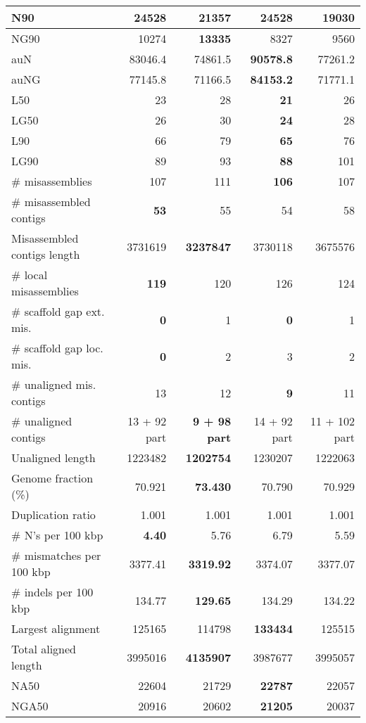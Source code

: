 \documentclass[12pt,a4paper]{article}
\begin{document}
\begin{table}[ht]
\begin{center}
\begin{tabular}{|l*{4}{|r}|}
N90 & {\bf 24528} & 21357 & {\bf 24528} & 19030 \\ \hline
NG90 & 10274 & {\bf 13335} & 8327 & 9560 \\ \hline
auN & 83046.4 & 74861.5 & {\bf 90578.8} & 77261.2 \\ \hline
auNG & 77145.8 & 71166.5 & {\bf 84153.2} & 71771.1 \\ \hline
L50 & 23 & 28 & {\bf 21} & 26 \\ \hline
LG50 & 26 & 30 & {\bf 24} & 28 \\ \hline
L90 & 66 & 79 & {\bf 65} & 76 \\ \hline
LG90 & 89 & 93 & {\bf 88} & 101 \\ \hline
\# misassemblies & 107 & 111 & {\bf 106} & 107 \\ \hline
\# misassembled contigs & {\bf 53} & 55 & 54 & 58 \\ \hline
Misassembled contigs length & 3731619 & {\bf 3237847} & 3730118 & 3675576 \\ \hline
\# local misassemblies & {\bf 119} & 120 & 126 & 124 \\ \hline
\# scaffold gap ext. mis. & {\bf 0} & 1 & {\bf 0} & 1 \\ \hline
\# scaffold gap loc. mis. & {\bf 0} & 2 & 3 & 2 \\ \hline
\# unaligned mis. contigs & 13 & 12 & {\bf 9} & 11 \\ \hline
\# unaligned contigs & 13 + 92 part & {\bf 9 + 98 part} & 14 + 92 part & 11 + 102 part \\ \hline
Unaligned length & 1223482 & {\bf 1202754} & 1230207 & 1222063 \\ \hline
Genome fraction (\%) & 70.921 & {\bf 73.430} & 70.790 & 70.929 \\ \hline
Duplication ratio & 1.001 & 1.001 & 1.001 & 1.001 \\ \hline
\# N's per 100 kbp & {\bf 4.40} & 5.76 & 6.79 & 5.59 \\ \hline
\# mismatches per 100 kbp & 3377.41 & {\bf 3319.92} & 3374.07 & 3377.07 \\ \hline
\# indels per 100 kbp & 134.77 & {\bf 129.65} & 134.29 & 134.22 \\ \hline
Largest alignment & 125165 & 114798 & {\bf 133434} & 125515 \\ \hline
Total aligned length & 3995016 & {\bf 4135907} & 3987677 & 3995057 \\ \hline
NA50 & 22604 & 21729 & {\bf 22787} & 22057 \\ \hline
NGA50 & 20916 & 20602 & {\bf 21205} & 20037 \\ \hline

\end{tabular}
\end{center}
\end{table}
\end{document}
